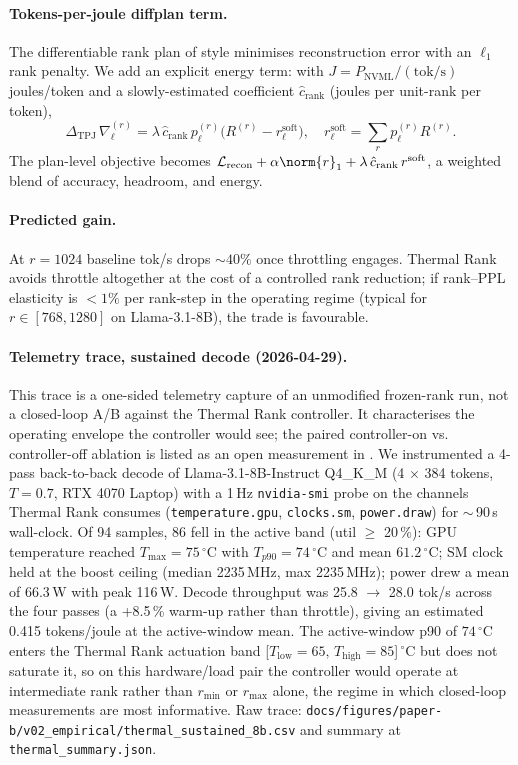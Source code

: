\documentclass[11pt]{article}
\begin{document}
\paragraph{Tokens-per-joule diffplan term.}  The differentiable rank plan
of \cite{robbins1951sa} style minimises reconstruction error with an
$\ell_1$ rank penalty.  We add an explicit energy term: with
$J=P_\text{NVML}/(\text{tok/s})$ joules/token and a slowly-estimated
coefficient $\hat c_\text{rank}$ (joules per unit-rank per token),
\[
\Delta_\text{TPJ}\,\nabla_\ell^{(r)}=
\lambda\,\hat c_\text{rank}\,p_\ell^{(r)}\bigl(R^{(r)}-r^\text{soft}_\ell\bigr),
\quad r^\text{soft}_\ell=\sum_r p_\ell^{(r)}R^{(r)}.
\]
The plan-level objective becomes $\mathcal L_\text{recon}+\alpha\norm{r}_1
+\lambda\,\hat c_\text{rank}\,r^\text{soft}$, a weighted blend of accuracy,
headroom, and energy.

\paragraph{Predicted gain.}  At $r{=}1024$ baseline tok/s drops $\sim 40\%$
once throttling engages.  Thermal Rank avoids throttle altogether at the
cost of a controlled rank reduction; if rank--PPL elasticity is $<1\%$ per
rank-step in the operating regime (typical for $r\in[768,1280]$ on
Llama-3.1-8B), the trade is favourable.

\paragraph{Telemetry trace, sustained decode (2026-04-29).}
This trace is a one-sided telemetry capture of an unmodified frozen-rank
run, not a closed-loop A/B against the Thermal Rank controller. It
characterises the operating envelope the controller would see; the paired
controller-on vs. controller-off ablation is listed as an open
measurement in .
We instrumented a 4-pass back-to-back decode of Llama-3.1-8B-Instruct
Q4\_K\_M (4 $\times$ 384 tokens, $T{=}0.7$, RTX 4070 Laptop) with a
1\,Hz \texttt{nvidia-smi} probe on the channels Thermal Rank consumes
(\texttt{temperature.gpu}, \texttt{clocks.sm}, \texttt{power.draw}) for
$\sim$\,90\,s wall-clock. Of 94 samples, 86 fell in the active band
(util $\geq$ 20\,\%): GPU temperature reached $T_\text{max}{=}75\,^\circ\mathrm{C}$
with $T_{p90}{=}74\,^\circ\mathrm{C}$ and mean $61.2\,^\circ\mathrm{C}$;
SM clock held at the boost ceiling (median 2235\,MHz, max 2235\,MHz);
power drew a mean of 66.3\,W with peak 116\,W. Decode throughput was
25.8 $\to$ 28.0 tok/s across the four passes (a +8.5\,\% warm-up
rather than throttle), giving an estimated
0.415 tokens/joule at the active-window mean. The active-window
p90 of $74\,^\circ\mathrm{C}$ enters the Thermal Rank actuation band
[$T_\text{low}{=}65,\,T_\text{high}{=}85$]\,$^\circ\mathrm{C}$ but does
not saturate it, so on this hardware/load pair the controller would
operate at intermediate rank rather than $r_\text{min}$ or
$r_\text{max}$ alone, the regime in which closed-loop measurements
are most informative. Raw trace:
\texttt{docs/figures/paper-b/v02\_empirical/thermal\_sustained\_8b.csv}
and summary at \texttt{thermal\_summary.json}.
\end{document}
